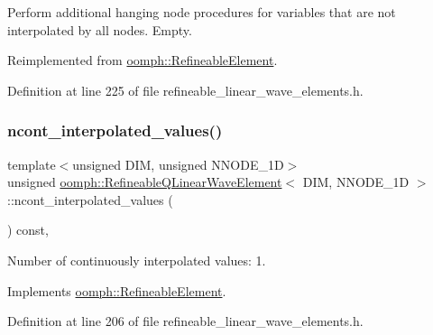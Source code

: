 Perform additional hanging node procedures for variables that are not interpolated by all nodes. Empty. 



Reimplemented from \hyperlink{classoomph_1_1RefineableElement_a86ea01c485f7ff822dce74b884312ccb}{oomph\+::\+Refineable\+Element}.



Definition at line 225 of file refineable\+\_\+linear\+\_\+wave\+\_\+elements.\+h.

\mbox{\label{classoomph_1_1RefineableQLinearWaveElement_ab776eb586ecad308a21a2b10e99936f3}} 
\subsubsection{\texorpdfstring{ncont\+\_\+interpolated\+\_\+values()}{ncont\_interpolated\_values()}}
{\footnotesize\ttfamily template$<$unsigned D\+IM, unsigned N\+N\+O\+D\+E\+\_\+1D$>$ \\
unsigned \hyperlink{classoomph_1_1RefineableQLinearWaveElement}{oomph\+::\+Refineable\+Q\+Linear\+Wave\+Element}$<$ D\+IM, N\+N\+O\+D\+E\+\_\+1D $>$\+::ncont\+\_\+interpolated\+\_\+values (\begin{DoxyParamCaption}{ }\end{DoxyParamCaption}) const\hspace{0.3cm}{\ttfamily [inline]}, {\ttfamily [virtual]}}



Number of continuously interpolated values\+: 1. 



Implements \hyperlink{classoomph_1_1RefineableElement_a53e171a18c9f43f1db90a6876516a073}{oomph\+::\+Refineable\+Element}.



Definition at line 206 of file refineable\+\_\+linear\+\_\+wave\+\_\+elements.\+h.

\mbox{\label{classoomph_1_1RefineableQLinearWaveElement_af9f398e0ffe8393e627754e1c96a0c37}} 
